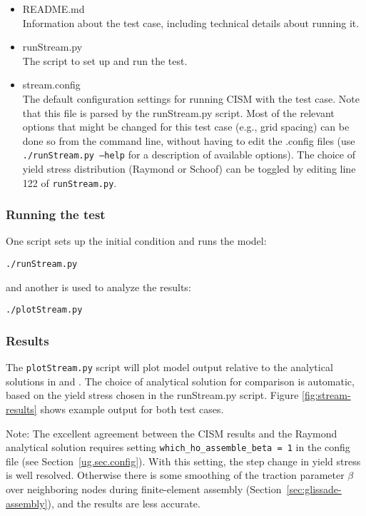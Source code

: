 \begin{itemize}
	\item README.md \\
		Information about the test case, including technical details about running it.
	\item runStream.py \\
		The script to set up and run the test.
	\item stream.config \\
  The default configuration settings for running CISM with the test case. Note that this
  file is parsed by the runStream.py script. Most of the relevant options that might be changed
  for this test case (e.g., grid spacing) can be done so from the command line, without having to
  edit the .config files (use \texttt{./runStream.py --help} for a description of available options).
  The choice of yield stress distribution (Raymond or Schoof) can be toggled
  by editing line 122 of \texttt{runStream.py}.
\end{itemize}

\subsubsection{Running the test}
One script sets up the initial condition and runs the model:

\texttt{./runStream.py}

\noindent
and another is used to analyze the results:

\texttt{./plotStream.py}

\subsubsection{Results}
The \texttt{plotStream.py} script will plot model output relative to the analytical solutions
in \citet{Raymond2000} and \citet{Schoof2006}. The choice of analytical solution for comparison
is automatic, based on the yield stress chosen in the runStream.py script. 
Figure \ref{fig:stream-results} shows example output for both test cases.

Note: The excellent agreement between the CISM results and the Raymond analytical solution
requires setting \texttt{which\_ho\_assemble\_beta = 1} in the config file
(see Section~\ref{ug.sec.config}). With this setting, the step change in yield
stress is well resolved. Otherwise there is some smoothing of the traction 
parameter $\beta$ over neighboring nodes during finite-element assembly
(Section~\ref{sec:glissade-assembly}), and the results are less accurate.
 
